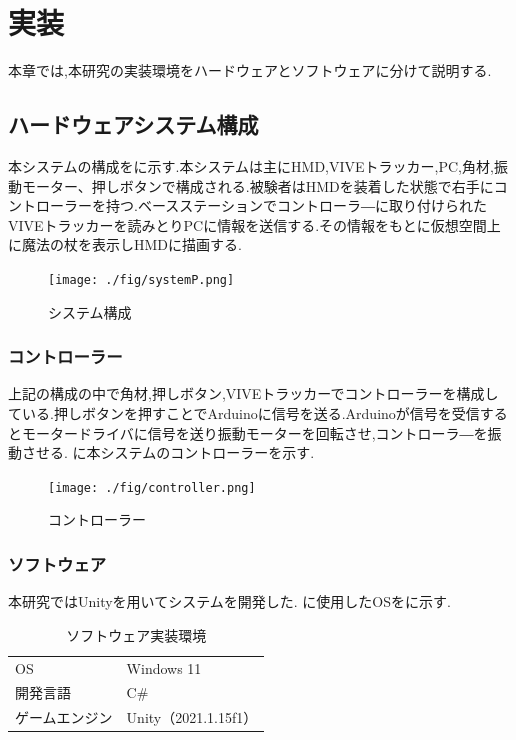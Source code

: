 \chapter{実装}
本章では,本研究の実装環境をハードウェアとソフトウェアに分けて説明する.

\section{ハードウェアシステム構成}
本システムの構成をに示す.本システムは主にHMD,VIVEトラッカー,PC,角材,振動モーター、押しボタンで構成される.被験者はHMDを装着した状態で右手にコントローラーを持つ.ベースステーションでコントローラ―に取り付けられたVIVEトラッカーを読みとりPCに情報を送信する.その情報をもとに仮想空間上に魔法の杖を表示しHMDに描画する.

\begin{figure}[h]
\centering
\texttt{[image: ./fig/systemP.png]}
\caption{システム構成}\label{sys}
\end{figure}

\newpage

\subsection{コントローラー}
上記の構成の中で角材,押しボタン,VIVEトラッカーでコントローラーを構成している.押しボタンを押すことでArduinoに信号を送る.Arduinoが信号を受信するとモータードライバに信号を送り振動モーターを回転させ,コントローラ―を振動させる.
に本システムのコントローラーを示す.

\begin{figure}[h]
\centering
\texttt{[image: ./fig/controller.png]}
\caption{コントローラー}\label{controller}
\end{figure}






\subsection{ソフトウェア}
本研究ではUnityを用いてシステムを開発した.
に使用したOSをに示す.

\begin{table}[H]
    \caption{\label{tab;software}ソフトウェア実装環境}
    \centering
    \begin{tabular}{l|l}
    \hline
    \hline
    OS & Windows 11\\
    開発言語 & C\#\\
    ゲームエンジン & Unity（2021.1.15f1）\\
    \hline
    \end{tabular}
\end{table}

